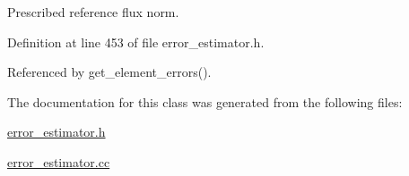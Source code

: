 Prescribed reference flux norm. 



Definition at line 453 of file error\+\_\+estimator.\+h.



Referenced by get\+\_\+element\+\_\+errors().



The documentation for this class was generated from the following files\+:\begin{DoxyCompactItemize}
\item 
\hyperlink{error__estimator_8h}{error\+\_\+estimator.\+h}\item 
\hyperlink{error__estimator_8cc}{error\+\_\+estimator.\+cc}\end{DoxyCompactItemize}
